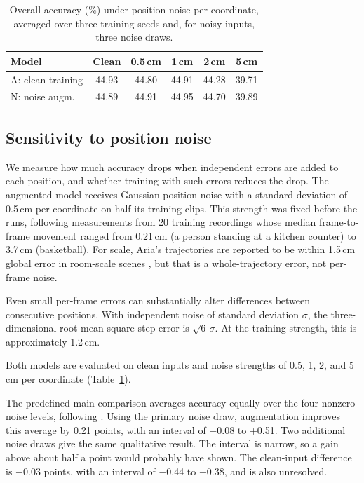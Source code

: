 \documentclass[10pt,twocolumn,letterpaper]{article}
\begin{document}
\begin{table}[t]
\centering\small
\setlength{\tabcolsep}{3.5pt}
\begin{tabular}{lccccc}
\toprule
Model & Clean & 0.5\,cm & 1\,cm & 2\,cm & 5\,cm \\
\midrule
A: clean training & 44.93 & 44.80 & 44.91 & 44.28 & 39.71 \\
N: noise augm. & 44.89 & 44.91 & 44.95 & 44.70 & 39.89 \\
\bottomrule
\end{tabular}
\caption{Overall accuracy (\%) under position noise per coordinate, averaged over three training seeds and, for
noisy inputs, three noise draws.}
\label{tab:noise}
\end{table}

\subsection{Sensitivity to position noise}
\label{sec:noise}
We measure how much accuracy drops when independent errors are added to each position, and whether training with
such errors reduces the drop. The augmented model receives Gaussian position noise with a standard deviation of 0.5\,cm per coordinate on half
its training clips. This strength was fixed before the runs, following measurements from 20 training recordings
whose median frame-to-frame movement ranged from 0.21\,cm (a person standing at a kitchen counter) to 3.7\,cm
(basketball). For scale, Aria's trajectories are reported to be within 1.5\,cm global error in room-scale scenes
\cite{engel2023aria}, but that is a whole-trajectory error, not per-frame noise.

Even small per-frame errors can substantially alter differences between consecutive positions. With independent
noise of standard deviation $\sigma$, the three-dimensional root-mean-square step error is $\sqrt{6}\,\sigma$. At
the training strength, this is approximately 1.2\,cm.

Both models are evaluated on clean inputs and noise strengths of 0.5, 1, 2, and 5\,cm per coordinate
(Table~\ref{tab:noise}).

The predefined main comparison averages accuracy equally over the four nonzero noise levels, following
\cite{hendrycks2019corruptions}. Using the primary noise draw, augmentation improves this average by 0.21 points,
with an interval of $-$0.08 to +0.51. Two additional noise draws give the same qualitative result. The interval is
narrow, so a gain above about half a point would probably have shown. The clean-input difference is $-$0.03 points,
with an interval of $-$0.44 to +0.38, and is also unresolved.
\end{document}
